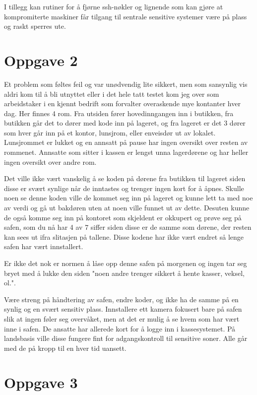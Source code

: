 \documentclass[12pt,a4paper,norsk]{article}
\begin{document}
I tillegg kan rutiner for å fjørne ssh-nøkler og lignende som kan gjøre at kompromiterte maskiner får tilgang til sentrale sensitive systemer være på plass og raskt sperres ute.

\section*{Oppgave 2}
Et problem som føltes feil og var unødvendig lite sikkert, men som sansynlig vis aldri kom til å bli utnyttet eller i det hele tatt testet kom jeg over som arbeidstaker i en kjennt bedrift som forvalter overaskende mye kontanter hver dag. Her finnes 4 rom. Fra utsiden fører hovedinngangen inn i butikken, fra butikken går det to dører med kode inn på lageret, og fra lageret er det 3 dører som hver går inn på et kontor, lunsjrom, eller enveisdør ut av lokalet. Lunsjrommet er lukket og en annsatt på pause har ingen oversikt over resten av rommenet. Annsatte som sitter i kassen er lengst unna lagerdørene og har heller ingen oversikt over andre rom.

Det ville ikke vært vanskelig å se koden på dørene fra butikken til lageret siden disse er svært synlige når de inntastes og trenger ingen kort for å åpnes. Skulle noen se denne koden ville de kommet seg inn på lageret og kunne lett ta med noe av verdi og gå ut bakdøren uten at noen ville funnet ut av dette. Desuten kunne de også komme seg inn på kontoret som skjeldent er okkupert og prøve seg på safen, som du nå har 4 av 7 siffer siden disse er de samme som dørene, der resten kan sees ut ifra slitasjen på tallene. Disse kodene har ikke vært endret så lenge safen har vært innstallert.

Er ikke det nok er normen å låse opp denne safen på morgenen og ingen tar seg bryet med å lukke den siden "noen andre trenger sikkert å hente kasser, veksel, ol.".

Være streng på håndtering av safen, endre koder, og ikke ha de samme på en synlig og en svært sensitiv plass. Innstallere ett kamera fokusert bare på safen slik at ingen føler seg overvåket, men at det er mulig å se hvem som har vært inne i safen. De ansatte har allerede kort for å logge inn i kassesystemet. På landsbasis ville disse fungere fint for adgangskontroll til sensitive soner. Alle går med de på kropp til en hver tid uansett.

\section*{Oppgave 3}
\end{document}
